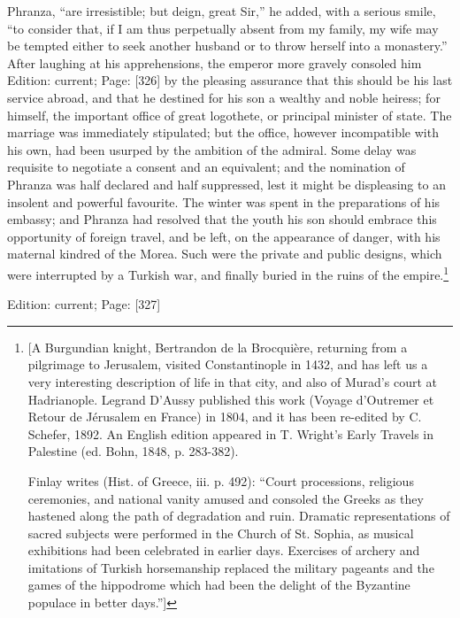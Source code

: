 Phranza, \texthebrew{“}are irresistible; but deign, great Sir,\texthebrew{}” he added, with a serious smile, \texthebrew{“}to consider that, if I am thus perpetually absent from my family, my wife may be tempted either to seek another husband or to throw herself into a monastery.\texthebrew{}” After laughing at his apprehensions, the emperor more gravely consoled him Edition: current; Page: [326] by the pleasing assurance that this should be his last service abroad, and that he destined for his son a wealthy and noble heiress; for himself, the important office of great logothete, or principal minister of state. The marriage was immediately stipulated; but the office, however incompatible with his own, had been usurped by the ambition of the admiral. Some delay was requisite to negotiate a consent and an equivalent; and the nomination of Phranza was half declared and half suppressed, lest it might be displeasing to an insolent and powerful favourite. The winter was spent in the preparations of his embassy; and Phranza had resolved that the youth his son should embrace this opportunity of foreign travel, and be left, on the appearance of danger, with his maternal kindred of the Morea. Such were the private and public designs, which were interrupted by a Turkish war, and finally buried in the ruins of the empire.\footnote{[A Burgundian knight, Bertrandon de la Brocquière, returning from a pilgrimage to Jerusalem, visited Constantinople in 1432, and has left us a very interesting description of life in that city, and also of Murad\texthebrew{}’s court at Hadrianople. Legrand D\texthebrew{}’Aussy published this work (Voyage d\texthebrew{}’Outremer et Retour de Jérusalem en France) in 1804, and it has been re-edited by C. Schefer, 1892. An English edition appeared in T. Wright\texthebrew{}’s Early Travels in Palestine (ed. Bohn, 1848, p. 283-382).

Finlay writes (Hist. of Greece, iii. p. 492): \texthebrew{“}Court processions, religious ceremonies, and national vanity amused and consoled the Greeks as they hastened along the path of degradation and ruin. Dramatic representations of sacred subjects were performed in the Church of St. Sophia, as musical exhibitions had been celebrated in earlier days. Exercises of archery and imitations of Turkish horsemanship replaced the military pageants and the games of the hippodrome which had been the delight of the Byzantine populace in better days.\texthebrew{}”]}

Edition: current; Page: [327]


